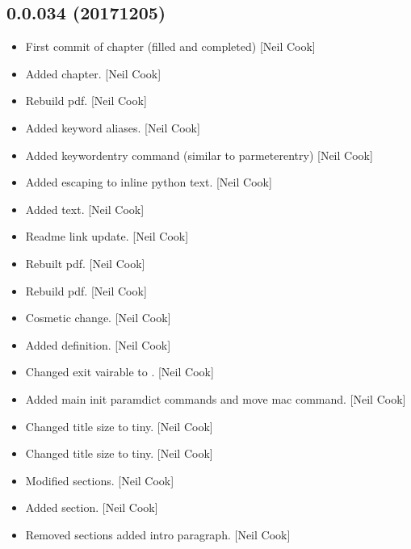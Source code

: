 \documentclass[a4paper,10pt,english]{report}
\begin{document}
\subsection{0.0.034 (2017\sphinxhyphen{}12\sphinxhyphen{}05)}
\label{\detokenize{misc/changelog:id537}}\begin{itemize}
\item {} 
First commit of  chapter (filled and completed) {[}Neil
Cook{]}

\item {} 
Added  chapter. {[}Neil Cook{]}

\item {} 
Rebuild pdf. {[}Neil Cook{]}

\item {} 
Added keyword aliases. {[}Neil Cook{]}

\item {} 
Added keywordentry command (similar to parmeterentry) {[}Neil Cook{]}

\item {} 
Added escaping to inline python text. {[}Neil Cook{]}

\item {} 
Added text. {[}Neil Cook{]}

\item {} 
Readme link update. {[}Neil Cook{]}

\item {} 
Rebuilt pdf. {[}Neil Cook{]}

\item {} 
Rebuild pdf. {[}Neil Cook{]}

\item {} 
Cosmetic change. {[}Neil Cook{]}

\item {} 
Added  definition. {[}Neil Cook{]}

\item {} 
Changed exit vairable to . {[}Neil Cook{]}

\item {} 
Added main init paramdict commands and move mac command. {[}Neil Cook{]}

\item {} 
Changed title size to tiny. {[}Neil Cook{]}

\item {} 
Changed title size to tiny. {[}Neil Cook{]}

\item {} 
Modified sections. {[}Neil Cook{]}

\item {} 
Added section. {[}Neil Cook{]}

\item {} 
Removed sections added intro paragraph. {[}Neil Cook{]}

\end{itemize}
\end{document}
